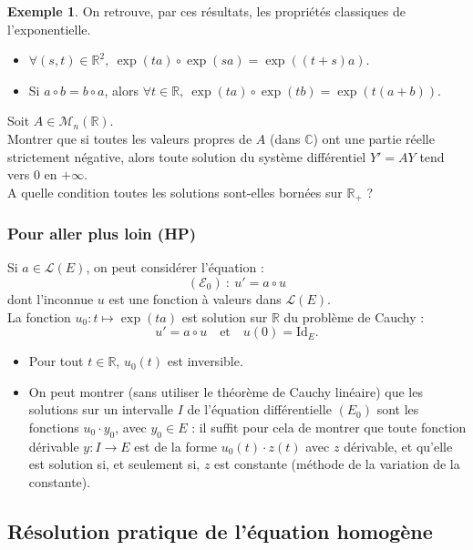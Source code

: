 \documentclass[french]{article}
\newcommand{\R}{\mathbb{R}}
\newcommand{\C}{\mathbb{C}}
\newcommand{\Id}{\text{Id}}
\theoremstyle{plain}
\theoremstyle{definition}
\newtheorem*{ex}{Exemple}
\theoremstyle{remark}
\begin{document}
\begin{ex}
	On retrouve, par ces résultats, les propriétés classiques de l'exponentielle.
	\begin{itemize}
		\item $\forall (s,t)\in\R^2,\ \exp(ta)\circ\exp(sa)=\exp((t+s)a)$.
		\item Si $a\circ b=b\circ a$, alors $\forall t\in\R,\ \exp(ta)\circ\exp(tb)=\exp(t(a+b))$.
	\end{itemize}
\end{ex}

\begin{exo}
	Soit $A\in\mathcal{M}_n(\R)$.\\
	Montrer que si toutes les valeurs propres de $A$ (dans $\C$) ont une partie réelle strictement négative, alors toute solution du système différentiel $Y'=AY$ tend vers $0$ en $+\infty$.\\
	A quelle condition toutes les solutions sont-elles bornées sur $\R_+$ ?
\end{exo}

\subsubsection*{Pour aller plus loin (HP)}

Si $a\in\mathcal{L}(E)$, on peut considérer l'équation :
$$(\mathcal{E}_0)\ :\ u'=a\circ u$$ dont l'inconnue $u$ est une fonction à valeurs dans $\mathcal{L}(E)$. \\
La fonction $u_0:t\mapsto\exp(ta)$ est solution sur $\R$ du problème de Cauchy :
$$u'=a\circ u\quad\text{et}\quad u(0)=\Id_E.$$
\begin{itemize}
	\item Pour tout $t\in\R$, $u_0(t)$ est inversible.
	\item On peut montrer (sans utiliser le théorème de Cauchy linéaire) que les solutions sur un intervalle $I$ de l'équation différentielle $(E_0)$ sont les fonctions $u_0\cdot y_0$, avec $y_0\in E$ : il suffit pour cela de montrer que toute fonction dérivable $y:I\to E$ est de la forme $u_0(t)\cdot z(t)$ avec $z$ dérivable, et qu'elle est solution si, et seulement si, $z$ est constante (méthode de la variation de la constante).
\end{itemize} 

\subsection{Résolution pratique de l'équation homogène}
\end{document}
